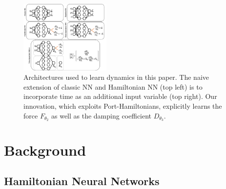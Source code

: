 \documentclass[twoside]{article}
\begin{document}
\begin{figure}[h!]
\centering
\includegraphics[width=0.4\textwidth]{figures/architect.png}
\caption{Architectures used to learn dynamics in this paper. The naive extension of classic NN and Hamiltonian NN (top left) is to incorporate time as an additional input variable (top right). Our innovation, which exploits Port-Hamiltonians, explicitly learns the force $F_{\theta_2}$ as well as the damping coefficient $D_{\theta_3}$.}
\label{fig.architecture}
\end{figure}

\section{Background}

\subsection{Hamiltonian Neural Networks}
\end{document}
